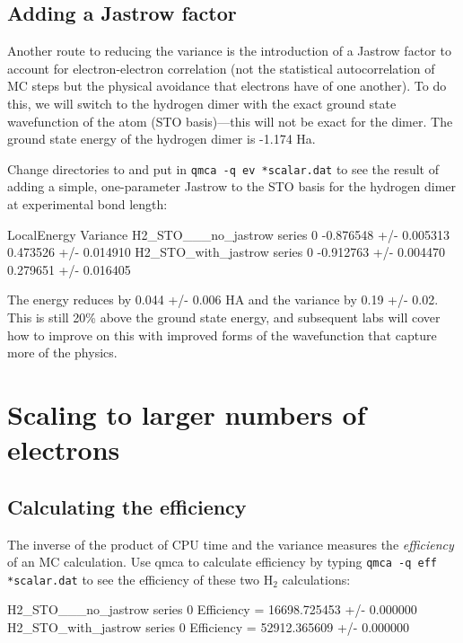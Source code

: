 \subsection{Adding a Jastrow factor}

Another route to reducing the variance is the introduction of a Jastrow factor to 
account for electron-electron correlation (not the statistical autocorrelation
of MC steps but the physical avoidance that electrons have of one another).
To do this, we will switch to the hydrogen dimer with the exact ground state
wavefunction of the atom (STO basis)---this will not be exact for the dimer.
The ground state energy of the hydrogen dimer is -1.174 Ha.

Change directories to  and put in \texttt{qmca -q ev *scalar.dat}
to see the result of adding a simple, one-parameter Jastrow to the STO basis
for the hydrogen dimer at experimental bond length:

\begin{shade}
                               LocalEnergy               Variance           
H2_STO___no_jastrow  series 0  -0.876548 +/- 0.005313   0.473526 +/- 0.014910
H2_STO_with_jastrow  series 0  -0.912763 +/- 0.004470   0.279651 +/- 0.016405
\end{shade}

The energy reduces by 0.044 +/- 0.006 HA and the variance by 0.19 +/- 0.02.
This is still 20\% above the ground state energy, and subsequent labs will cover how
to improve on this with improved forms of the wavefunction that capture more
of the physics.

\section{Scaling to larger numbers of electrons}

\subsection{Calculating the efficiency}

The inverse of the product of CPU time and the variance measures the
\textit{efficiency} of an MC calculation.  Use qmca to calculate efficiency by
typing \texttt{qmca -q eff *scalar.dat} to see the efficiency of these two
H$_2$ calculations:

\begin{shade}
H2_STO___no_jastrow  series 0  Efficiency = 16698.725453 +/- 0.000000 
H2_STO_with_jastrow  series 0  Efficiency = 52912.365609 +/- 0.000000 
\end{shade}

